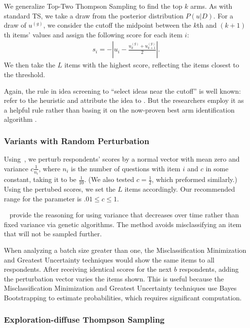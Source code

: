 \documentclass[a4paper,11pt]{article}
\newcommand{\numperset}{L}
\begin{document}
We generalize Top-Two Thompson Sampling to find the top $k$ arms. As with standard TS, we take a draw from the posterior distribution $P(u|D)$. For a draw of $u^{(g)}$, we consider the cutoff the midpoint between the $k$th and $(k+1)$th items' values and assign the following score for each item $i$:
\begin{align}
s_i= - | u_i - \frac{u_k^{(g)} +u_{k+1}^{(g)} }{2}|.
\end{align} 
We then take the $\numperset$ items with the highest score, reflecting the items closest to the threshold. 

Again, the rule in idea screening to ``select ideas near the cutoff'' is well known: \cite{toubia2007adaptive} refer to the heuristic and attribute the idea to \cite{bradlow1998some}. But the researchers employ it as a helpful rule rather than basing it on the now-proven best arm identification algorithm \citep{russo2016simple}.

\subsubsection{Variants with Random Perturbation}

Using~\cite{toubia2007adaptive},  we perturb respondents' scores by a normal vector with mean zero and variance $c\frac{1}{n_i}$, where $n_i$ is the number of questions with item $i$ and $c$ in some constant, taking it to be $\frac{1}{10}$. (We also tested $c=\frac{1}{2}$, which preformed similarly.) Using the pertubed scores, we set the $\numperset$ items accordingly. Our recommended range for the parameter is $.01 \leq c \leq 1$.

~\cite{toubia2007adaptive} provide the reasoning for using variance that decreases over time rather than fixed variance via genetic algorithms. The method avoids misclassifying an item that will not be sampled further.

When analyzing a batch size greater than one, the Misclassification Minimization and Greatest Uncertainty techniques would show the same items to all respondents. After receiving identical scores for the next $b$ respondents, adding the perturbation vector varies the items shown. This is useful because the Misclassification Minimization and Greatest Uncertainty techniques use Bayes Bootstrapping to estimate probabilities, which requires significant computation.

\subsubsection{Exploration-diffuse Thompson Sampling}
\end{document}
